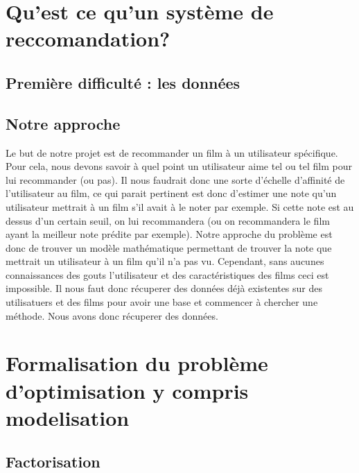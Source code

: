 \documentclass[a4paper,10pt]{article}
\title{}
\author{}
\begin{document}
\maketitle

\begin{abstract}
\end{abstract}

\section{Qu'est ce qu'un système de reccomandation?}
\subsection{Première difficulté : les données}
\subsection{Notre approche}
Le but de notre projet est de recommander un film à un utilisateur spécifique. 
Pour cela, nous devons savoir à quel point un utilisateur aime tel ou tel film pour lui recommander (ou pas). 
Il nous faudrait donc une sorte d'échelle d'affinité de l'utilisateur au film, ce qui parait pertinent est donc d'estimer une note qu'un utilisateur mettrait à un film s'il avait à le noter par exemple. 
Si cette note est au dessus d'un certain seuil, on lui recommandera (ou on recommandera le film ayant la meilleur note prédite par exemple). 
Notre approche du problème est donc de trouver un modèle mathématique permettant de trouver la note que mettrait un utilisateur à un film qu'il n'a pas vu. 
Cependant, sans aucunes connaissances des gouts l'utilisateur et des caractéristiques des films ceci est impossible. Il nous faut donc récuperer des données déjà existentes sur des utilisatuers et des films pour avoir une base et commencer à chercher une méthode.  
Nous avons donc récuperer des données.
\subsection{}
\section{Formalisation du problème d'optimisation y compris modelisation}
\subsection{Factorisation}
\end{document}
